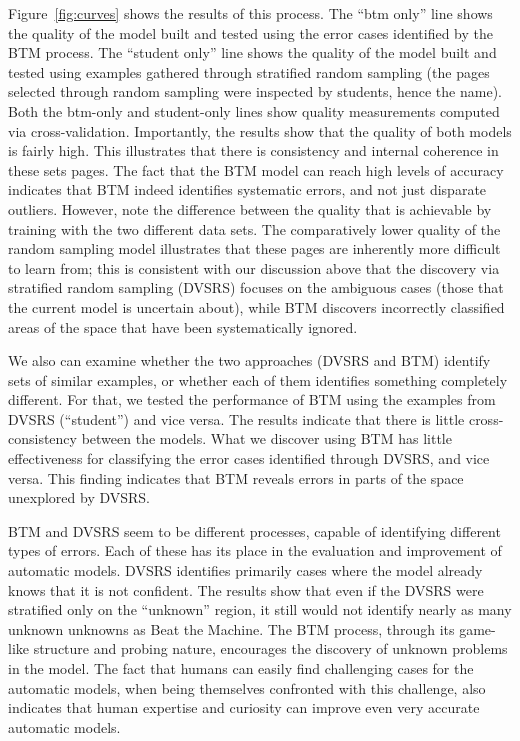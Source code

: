 Figure~\ref{fig:curves} shows the results of this process. The ``btm
only'' line shows the quality of the model built and tested using the
error cases identified by the BTM process.  The ``student only'' line
shows the quality of the model built and tested using examples
gathered through stratified random sampling (the pages selected
through random sampling were inspected by students, hence the
name). Both the btm-only and student-only lines show quality
measurements computed via cross-validation.  
Importantly, the results show that the
quality of both models is fairly high.  This illustrates that there is
consistency and internal coherence in these sets pages.  The fact that
the BTM model can reach high levels of accuracy indicates that BTM
indeed identifies systematic errors, and not just disparate outliers.
However, note the difference between the quality that is achievable by training with the two different data sets.  
The comparatively lower quality of the random sampling model
illustrates that these pages are inherently more difficult to learn
from; this is consistent with our discussion above that the discovery
via stratified random sampling (DVSRS) focuses on the ambiguous cases
(those that the current model is uncertain about), while BTM discovers
incorrectly classified areas of the space that have been
systematically ignored.

We also can examine whether the two approaches (DVSRS and BTM) identify sets of similar examples, or whether each of them identifies something completely different. For that, we tested the performance of BTM using the examples from DVSRS (``student'') and vice versa. The results indicate that there is little cross-consistency between the models. What we discover using BTM has little effectiveness for classifying the error cases identified through DVSRS, and vice versa. This finding indicates  that BTM reveals errors in parts of the space unexplored by DVSRS.

BTM and DVSRS seem to be different processes, capable of identifying different types of errors. Each of these has its place in the evaluation and improvement of automatic models. DVSRS identifies primarily cases where the model already knows that it is not confident. 
The results show that even if the DVSRS were stratified only on the ``unknown'' region, it still would not identify nearly as many unknown unknowns as Beat the Machine.
The BTM process, through its game-like structure and probing nature, encourages the discovery of unknown problems in the model. The fact that humans can easily find challenging cases for the automatic models, when being themselves confronted with this challenge, also indicates that human expertise and curiosity can improve even very accurate automatic models.



